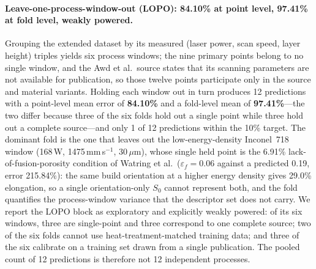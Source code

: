 \documentclass[11pt,a4paper,twocolumn]{article}
\begin{document}
\paragraph{Leave-one-process-window-out (LOPO): 84.10\% at point level, 97.41\% at fold level, weakly powered.}
Grouping the extended dataset by its measured (laser power, scan speed, layer height) triples yields six
process windows; the nine primary points belong to no single window, and the Awd et al.\ source states
that its scanning parameters are not available for publication, so those twelve points participate only
in the source and material variants. Holding each window out in turn produces 12 predictions with a
point-level mean error of \textbf{84.10\%} and a fold-level mean of \textbf{97.41\%}---the two differ
because three of the six folds hold out a single point while three hold out a complete source---and only
1 of 12 predictions within the 10\% target. The dominant fold is the one that leaves out the
low-energy-density Inconel~718 window (168\,W, 1475\,mm\,s$^{-1}$, 30\,$\mu$m), whose single held point is
the 6.91\% lack-of-fusion-porosity condition of Watring et al.\ ($\varepsilon_f = 0.06$ against a
predicted 0.19, error 215.84\%): the same build orientation at a higher energy density gives 29.0\%
elongation, so a single orientation-only $S_0$ cannot represent both, and the fold quantifies the
process-window variance that the descriptor set does not carry. We report the LOPO block as exploratory
and explicitly weakly powered: of its six windows, three are single-point and three correspond to one
complete source; two of the six folds cannot use heat-treatment-matched training data; and three of the
six calibrate on a training set drawn from a single publication. The pooled count of 12 predictions is
therefore not 12 independent processes.
\end{document}
